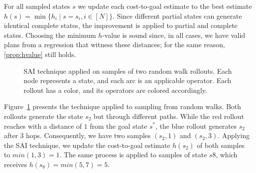 For all sampled states $s$ we update each cost-to-goal estimate to the best estimate $h(s) = \min\{h_i \mid s=s_i, i\in[N]\}$. Since different partial states can generate identical complete states, the improvement is applied to partial and complete states. Choosing the minimum $h$-value is sound since, in all cases, we have valid plans from a regression that witness these distances; for the same reason, \cref{prop:hvalue} still holds.

\begin{figure}[ht]
    \caption[SAI technique applied on samples of random walk rollouts.]{SAI technique applied on samples of two random walk rollouts. Each node represents a state, and each arc is an applicable operator. Each rollout has a color, and its operators are colored accordingly.}
    \label{fig:sai}
    \addvspace{\baselineskip}
    \centering
\end{figure}

Figure~\ref{fig:sai} presents the technique applied to sampling from random walks. Both rollouts generate the state $s_2$ but through different paths. While the red rollout reaches with a distance of $1$ from the goal state $s^*$, the blue rollout generates $s_2$ after $3$ hops. Consequently, we have two samples $(s_2,1)$ and $(s_2,3)$. Applying the SAI technique, we update the cost-to-goal estimate $h(s_2)$ of both samples to $min(1,3)=1$. The same process is applied to samples of state $s8$, which receives $h(s_8)=min(5,7)=5$.

